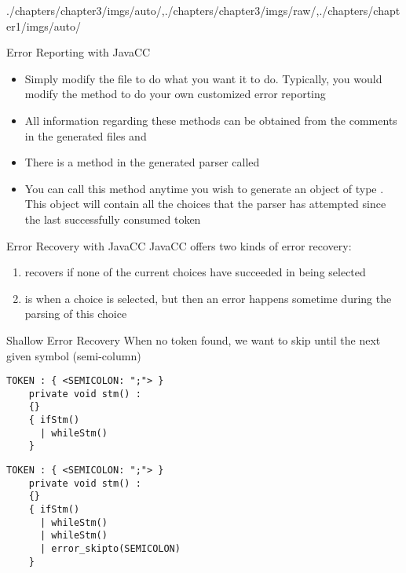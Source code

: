 \begin{graphicspathcontext}{{./chapters/chapter3/imgs/auto/},{./chapters/chapter3/imgs/raw/},{./chapters/chapter1/imgs/auto/}}
\begin{bibunit}[apalike]
\begin{frame}{Error Reporting with JavaCC}
	\begin{itemize}
	\item Simply modify the file  to do what you want it to do. Typically, you would modify the  method to do your own customized error reporting
	\item All information regarding these methods can be obtained from the comments in the generated files  and 
	\vfill
	\item There is a method in the generated parser called 
	\item You can call this method anytime you wish to generate an object of type . This object will contain all the choices that the parser has attempted since the last successfully consumed token
	\end{itemize}
\end{frame}

\begin{frame}{Error Recovery with JavaCC}
	JavaCC offers two kinds of error recovery:
	\vfill
	\begin{enumerate}
	\item[Shallow recovery] recovers if none of the current choices have succeeded in being selected
	\vfill
	\item[Deep recovery] is when a choice is selected, but then an error happens sometime during the parsing of this choice
	\end{enumerate}
\end{frame}

\begin{frame}[t,fragile]{Shallow Error Recovery}
	When no token found, we want to skip until the next given symbol (semi-column) \\
	\begin{lstlisting}[style=lststyle-java]
	TOKEN : { <SEMICOLON: ";"> }
	private void stm() :
	{}
	{ ifStm()
	  | whileStm()
	}
	\end{lstlisting}
	\begin{center}\end{center}
	\begin{lstlisting}[style=lststyle-java]
	TOKEN : { <SEMICOLON: ";"> }
	private void stm() :
	{}
	{ ifStm()
	  | whileStm()
	  | whileStm()
	  | error_skipto(SEMICOLON)
	}
	\end{lstlisting}
\end{frame}


\end{bibunit}
\end{graphicspathcontext}
